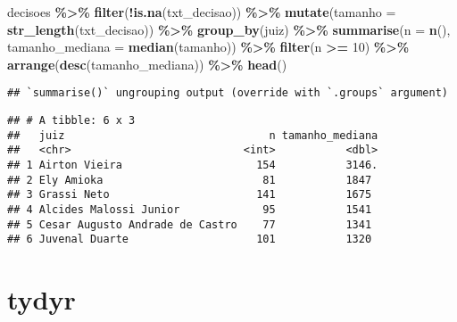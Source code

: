 \documentclass[
  10pt,
  ignorenonframetext,
]{beamer}
\newenvironment{Shaded}{\begin{snugshade}}{\end{snugshade}}
\newcommand{\DataTypeTok}[1]{\textcolor[rgb]{0.13,0.29,0.53}{#1}}
\newcommand{\DecValTok}[1]{\textcolor[rgb]{0.00,0.00,0.81}{#1}}
\newcommand{\KeywordTok}[1]{\textcolor[rgb]{0.13,0.29,0.53}{\textbf{#1}}}
\newcommand{\NormalTok}[1]{#1}
\newcommand{\OperatorTok}[1]{\textcolor[rgb]{0.81,0.36,0.00}{\textbf{#1}}}
\newcommand{\StringTok}[1]{\textcolor[rgb]{0.31,0.60,0.02}{#1}}
\begin{document}
\begin{frame}[fragile]{}
\protect\hypertarget{section-4}{}
\begin{Shaded}
\begin{Highlighting}[]
\NormalTok{decisoes }\OperatorTok{\%\textgreater{}\%}\StringTok{ }
\StringTok{  }\KeywordTok{filter}\NormalTok{(}\OperatorTok{!}\KeywordTok{is.na}\NormalTok{(txt\_decisao)) }\OperatorTok{\%\textgreater{}\%}\StringTok{ }
\StringTok{  }\KeywordTok{mutate}\NormalTok{(}\DataTypeTok{tamanho =} \KeywordTok{str\_length}\NormalTok{(txt\_decisao)) }\OperatorTok{\%\textgreater{}\%}\StringTok{ }
\StringTok{  }\KeywordTok{group\_by}\NormalTok{(juiz) }\OperatorTok{\%\textgreater{}\%}\StringTok{ }
\StringTok{  }\KeywordTok{summarise}\NormalTok{(}\DataTypeTok{n =} \KeywordTok{n}\NormalTok{(), }
            \DataTypeTok{tamanho\_mediana =} \KeywordTok{median}\NormalTok{(tamanho)) }\OperatorTok{\%\textgreater{}\%}\StringTok{ }
\StringTok{  }\KeywordTok{filter}\NormalTok{(n }\OperatorTok{\textgreater{}=}\StringTok{ }\DecValTok{10}\NormalTok{) }\OperatorTok{\%\textgreater{}\%}\StringTok{ }
\StringTok{  }\KeywordTok{arrange}\NormalTok{(}\KeywordTok{desc}\NormalTok{(tamanho\_mediana)) }\OperatorTok{\%\textgreater{}\%}
\StringTok{  }\KeywordTok{head}\NormalTok{()}
\end{Highlighting}
\end{Shaded}

\begin{verbatim}
## `summarise()` ungrouping output (override with `.groups` argument)
\end{verbatim}

\begin{verbatim}
## # A tibble: 6 x 3
##   juiz                                n tamanho_mediana
##   <chr>                           <int>           <dbl>
## 1 Airton Vieira                     154           3146.
## 2 Ely Amioka                         81           1847 
## 3 Grassi Neto                       141           1675 
## 4 Alcides Malossi Junior             95           1541 
## 5 Cesar Augusto Andrade de Castro    77           1341 
## 6 Juvenal Duarte                    101           1320
\end{verbatim}
\end{frame}

\hypertarget{tydyr}{%
\section{tydyr}\label{tydyr}}
\end{document}
